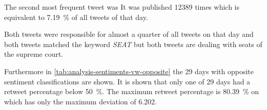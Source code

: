 \begin{enumerate}
        
        The second most frequent tweet was
        It was published \num{12389} times which is equivalent to \SI{7.19}{\percent} of all tweets of that day.

        Both tweets were responsible for almost a quarter of all tweets on that day and both tweets matched the keyword \emph{SEAT} but both tweets are dealing with seats of the supreme court. 

\end{enumerate}

Furthermore in \cref{tab:analysis-sentiments-vw-opposite} the 29 days with opposite sentiment classifications are shown.
It is shown that only one of 29 days had a retweet percentage below \SI{50}{\percent}.
The maximum retweet percentage is \SI{80.39}{\percent} on  which has only the maximum deviation of \num{6.202}.

